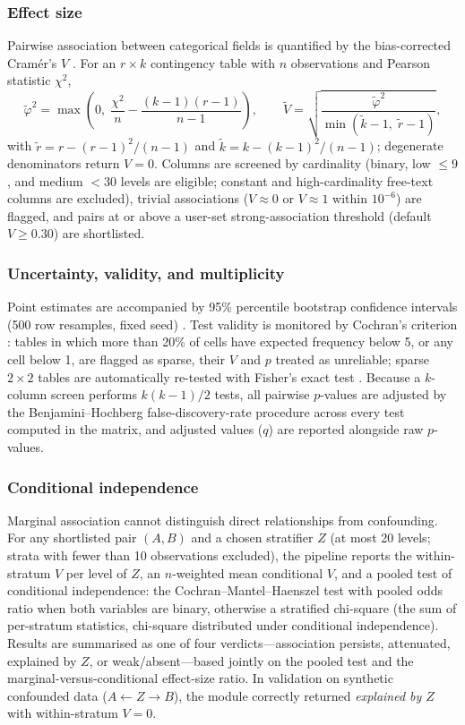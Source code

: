 \documentclass[11pt,a4paper]{article}
\begin{document}
\subsubsection{Effect size}
Pairwise association between categorical fields is quantified by the bias-corrected
Cram\'er's $V$ \cite{cramer1946,bergsma2013}. For an $r \times k$ contingency table with
$n$ observations and Pearson statistic $\chi^2$,
\begin{equation}
\tilde{\varphi}^2 = \max\!\left(0,\; \frac{\chi^2}{n} - \frac{(k-1)(r-1)}{n-1}\right),
\qquad
\tilde{V} = \sqrt{\frac{\tilde{\varphi}^2}{\min(\tilde{k}-1,\; \tilde{r}-1)}},
\end{equation}
with $\tilde{r} = r - (r-1)^2/(n-1)$ and $\tilde{k} = k - (k-1)^2/(n-1)$; degenerate
denominators return $V = 0$. Columns are screened by cardinality (binary, low
$\le 9$, and medium $< 30$ levels are eligible; constant and high-cardinality
free-text columns are excluded), trivial associations ($V \approx 0$ or $V \approx 1$
within $10^{-6}$) are flagged, and pairs at or above a user-set strong-association
threshold (default $V \ge 0.30$) are shortlisted.

\subsubsection{Uncertainty, validity, and multiplicity}
Point estimates are accompanied by 95\% percentile bootstrap confidence intervals
(500 row resamples, fixed seed) \cite{efron1979}. Test validity is monitored by
Cochran's criterion \cite{cochran1954}: tables in which more than 20\% of cells have
expected frequency below 5, or any cell below 1, are flagged as sparse, their $V$ and
$p$ treated as unreliable; sparse $2\times2$ tables are automatically re-tested with
Fisher's exact test \cite{fisher1922}. Because a $k$-column screen performs
$k(k-1)/2$ tests, all pairwise $p$-values are adjusted by the Benjamini--Hochberg
false-discovery-rate procedure \cite{benjamini1995} across every test computed in the
matrix, and adjusted values ($q$) are reported alongside raw $p$-values.

\subsubsection{Conditional independence}
Marginal association cannot distinguish direct relationships from confounding.
For any shortlisted pair $(A, B)$ and a chosen stratifier $Z$ (at most 20 levels;
strata with fewer than 10 observations excluded), the pipeline reports the within-stratum
$V$ per level of $Z$, an $n$-weighted mean conditional $V$, and a pooled test of
conditional independence: the Cochran--Mantel--Haenszel test \cite{mantel1959} with
pooled odds ratio when both variables are binary, otherwise a stratified chi-square
(the sum of per-stratum statistics, chi-square distributed under conditional
independence). Results are summarised as one of four verdicts---association persists,
attenuated, explained by $Z$, or weak/absent---based jointly on the pooled test and the
marginal-versus-conditional effect-size ratio. In validation on synthetic confounded
data ($A \leftarrow Z \rightarrow B$), the module correctly returned
\emph{explained by $Z$} with within-stratum $V = 0$.
\end{document}
